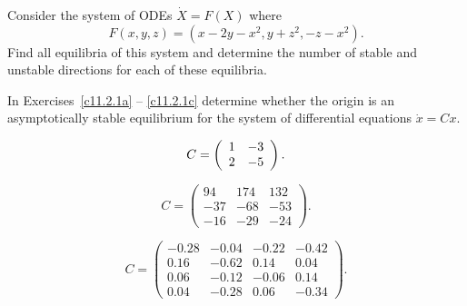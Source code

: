\documentclass{ximera}
\begin{document}
\begin{exercise} \label{c14.2.1F}
Consider the system of ODEs $\dot{X}=F(X)$ where
\[
F(x,y,z) = (x - 2y - x^2, y + z^2, -z - x^2).
\]
Find all equilibria of this system and determine the number of stable and 
unstable directions for each of these equilibria.
\end{exercise}

\CEXER

\noindent In Exercises~\ref{c11.2.1a} -- \ref{c11.2.1c} determine whether 
the origin is an asymptotically stable equilibrium for the system of 
differential equations $\dot{x}=Cx$.
\begin{exercise} \label{c11.2.1a}
\[
C=\left(\begin{array}{rr} 1 & -3\\ 2 &-5\end{array}\right).
\]
\end{exercise}
\begin{exercise} \label{c11.2.1b}
\begin{equation*}
C=\left(\begin{array}{rrr} 
94 & 174 & 132 \\ 
-37 & -68 & -53 \\
-16 & -29 & -24 \end{array}\right).
\end{equation*}
\end{exercise}
\begin{exercise} \label{c11.2.1c}
\begin{equation*}
C=\left(\begin{array}{rrrr} 
-0.28 & -0.04 & -0.22 & -0.42 \\ 
0.16 & -0.62 & 0.14 & 0.04 \\ 
0.06 & -0.12 & -0.06 & 0.14 \\ 
0.04 & -0.28 & 0.06 & -0.34 \end{array}\right).
\end{equation*}
\end{exercise}
\end{document}
